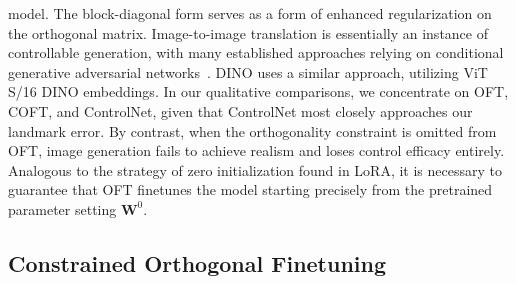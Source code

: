 \begin{itemize}[leftmargin=*,nosep]
model. The block-diagonal form serves as a form of enhanced regularization on the orthogonal matrix. Image-to-image translation is essentially an instance of controllable generation, with many established approaches relying on conditional generative adversarial networks~\cite{isola2017image,zhu2017toward,wang2018high,park2019semantic,choi2018stargan}. DINO uses a similar approach, utilizing ViT S/16 DINO embeddings. In our qualitative comparisons, we concentrate on OFT, COFT, and ControlNet, given that ControlNet most closely approaches our landmark error. By contrast, when the orthogonality constraint is omitted from OFT, image generation fails to achieve realism and loses control efficacy entirely. Analogous to the strategy of zero initialization found in LoRA, it is necessary to guarantee that OFT finetunes the model starting precisely from the pretrained parameter setting $\bm{W}^0$. \subsection{Constrained Orthogonal Finetuning}


\end{itemize}
